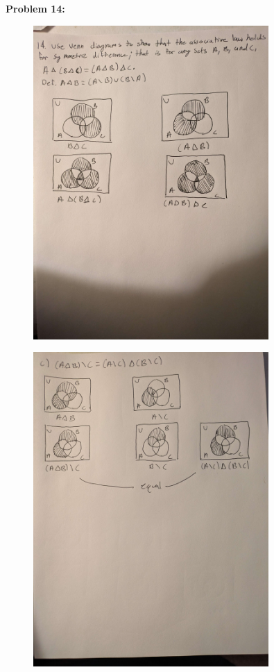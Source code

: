 \textbf{Problem 14:}
\begin{figure}[H]
    \centering
    \includegraphics[width=0.8\textwidth]{images/1.2/10.jpg}
\end{figure}
\begin{figure}[H]
    \centering
    \includegraphics[width=0.8\textwidth]{images/1.2/11.jpg}
\end{figure}
